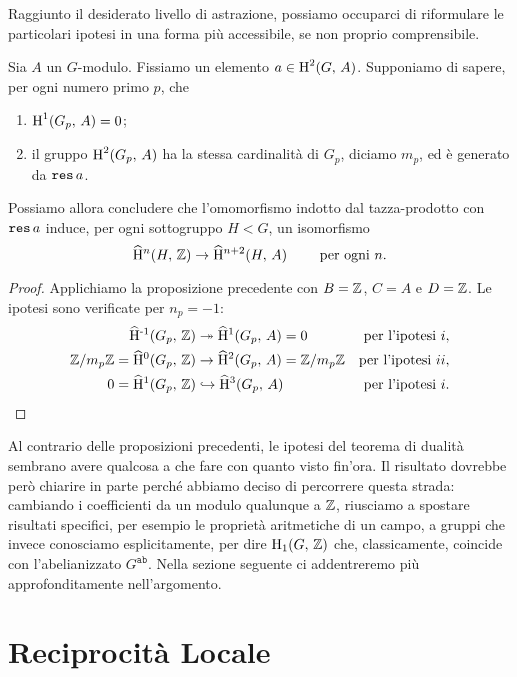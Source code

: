 Raggiunto il desiderato livello di astrazione, possiamo occuparci di riformulare le particolari ipotesi in una forma più accessibile, se non proprio comprensibile.

\begin{theorem}
	Sia $ A $ un $ G $-modulo. Fissiamo un elemento $ a \in \operatorname{H}^2(G, \, A) $. Supponiamo di sapere, per ogni numero primo $ p $, che
	\begin{enumerate}[label = \roman*.]
		\item $ \operatorname{H}^1(G_p, \, A) = 0 $;
		\item il gruppo $ \operatorname{H}^2(G_p, \, A) $ ha la stessa cardinalità di $ G_p $, diciamo $ m_p $, ed è generato da $ \operatorname{\mathtt{res}} a $.
	\end{enumerate}
	Possiamo allora concludere che l'omomorfismo indotto dal tazza-prodotto con $ \operatorname{\mathtt{res}} a $ induce, per ogni sottogruppo $ H < G $, un isomorfismo
	\[ \operatorname{\widehat{H}^{\mathnormal{n}}}(H, \, \mathbb{Z}) \to \operatorname{\widehat{H}^{\mathnormal{n}+2}}(H, \,  A) \qquad \text{ per ogni } n.\]
\end{theorem}

\begin{proof}
	Applichiamo la proposizione precedente con $ B = \mathbb{Z} $, $ C = A $ e $ D = \mathbb{Z} $. Le ipotesi sono verificate per $ n_p = -1 $:
	\begin{align*}
		\operatorname{\widehat{H}^{-1}}(G_p,\, \mathbb{Z}) &\twoheadrightarrow \operatorname{\widehat{H}^{1}}(G_p,\, A) = 0 & \text{per l'ipotesi } i, \\
		\mathbb{Z}/m_p\mathbb{Z}=\operatorname{\widehat{H}^{0}}(G_p,\, \mathbb{Z}) &\to \operatorname{\widehat{H}^{2}}(G_p,\, A) = \mathbb{Z}/m_p\mathbb{Z} & \text{per l'ipotesi } ii,\\
		0 = \operatorname{\widehat{H}^{1}}(G_p,\, \mathbb{Z}) &\hookrightarrow \operatorname{\widehat{H}^{3}}(G_p,\, A) & \text{per l'ipotesi } i. 
	\end{align*}
	\qedhere
\end{proof}
Al contrario delle proposizioni precedenti, le ipotesi del teorema di dualità sembrano avere qualcosa a che fare con quanto visto fin'ora. Il risultato dovrebbe però chiarire in parte perché abbiamo deciso di percorrere questa strada: cambiando i coefficienti da un modulo qualunque a $ \mathbb{Z} $, riusciamo a spostare risultati specifici, per esempio le proprietà aritmetiche di un campo, a gruppi che invece conosciamo esplicitamente, per dire $ \operatorname{H}_1(G, \, \mathbb{Z}) $ che, classicamente, coincide con l'abelianizzato $ G^\texttt{ab} $. Nella sezione seguente ci addentreremo più approfonditamente nell'argomento.
\section{Reciprocità Locale}

